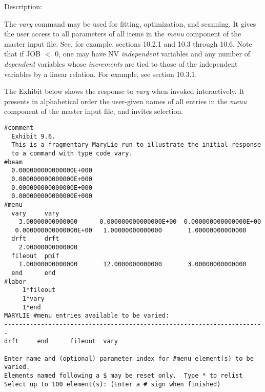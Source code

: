 \vspace{5mm}
     Description:
\vspace{2mm}

The {\em vary} command may be used for fitting, optimization, and scanning.  It gives the user access to all parameters of all items in the {\em menu} component of the \Mary master input file.  See, for example, sections 10.2.1 and 10.3 through 10.6.  Note that if JOB $<$ 0, one may have NV {\em independent} variables and any number of {\em dependent} variables whose {\em increments} are tied to those of the independent variables by a linear relation.  For example, see section 10.3.1.

The Exhibit below shows the \Mary response to {\em vary} when invoked interactively.  It presents in alphabetical order the user-given names of all entries in the {\em menu} component of the master input file, and invites selection.

\vspace{5mm}
\begin{footnotesize}
\begin{verbatim}
#comment
  Exhibit 9.6.
  This is a fragmentary MaryLie run to illustrate the initial response
  to a command with type code vary.
#beam
  0.000000000000000E+000
  0.000000000000000E+000
  0.000000000000000E+000
  0.000000000000000E+000
#menu
  vary     vary
    3.00000000000000      0.000000000000000E+00  0.000000000000000E+00
   0.000000000000000E+00   1.00000000000000       1.00000000000000
  drft     drft
    2.00000000000000
  fileout  pmif
    1.00000000000000       12.0000000000000       3.00000000000000
  end      end
#labor
     1*fileout
     1*vary
     1*end
MARYLIE #menu entries available to be varied:
-----------------------------------------------------------------------
drft     end      fileout  vary

Enter name and (optional) parameter index for #menu element(s) to be
varied.
Elements named following a $ may be reset only.  Type * to relist
Select up to 100 element(s): (Enter a # sign when finished)

\end{verbatim}
\end{footnotesize}

\newpage
